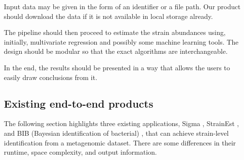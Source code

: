 \documentclass{article}
\begin{document}
Input data may be given in the form of an identifier or a file path. Our product should download the data if it is not available in local storage already.

The pipeline should then proceed to estimate the strain abundances using, initially, multivariate regression and possibly some machine learning tools. The design should be modular so that the exact algorithms are interchangeable.

In the end, the results should be presented in a way that allows the users to easily draw conclusions from it.





\subsection{Existing end-to-end products}

The following section highlights three existing applications, Sigma \cite{ahn2015sigma}, StrainEst \cite{StrainEst}, and BIB (Bayesian identification of bacterial) \cite{mbs:/content/journal/mgen/10.1099/mgen.0.000075}, that can achieve strain-level identification from a metagenomic dataset. There are some differences in their runtime, space complexity, and output information. 
\end{document}

